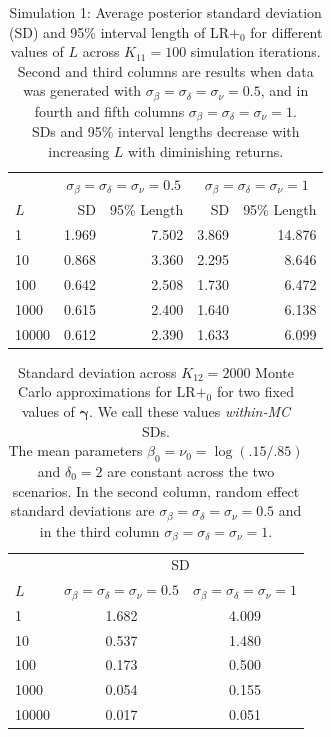 \documentclass[AMA,STIX1COL]{WileyNJD-v2}
\newcommand{\boldgamma}{\boldsymbol{\gamma}}
\begin{document}
\clearpage

\begin{table}[!ht]
\centering
\begin{tabular}{lrrrr}
         & \multicolumn{2}{c}{$\sigma_{\beta} = \sigma_{\delta} = \sigma_{\nu} = 0.5$}           & \multicolumn{2}{c}{$\sigma_{\beta} = \sigma_{\delta} = \sigma_{\nu} = 1$}                 \\ 
     \cline{2-5}    $L$ & \multicolumn{1}{r}{SD} & \multicolumn{1}{r}{95\% Length} & \multicolumn{1}{r}{SD} & \multicolumn{1}{r}{95\% Length} \\ \hline
1 & 1.969 & 7.502 & 3.869 & 14.876 \\ 
  10 & 0.868 & 3.360 & 2.295 & 8.646 \\ 
  100 & 0.642 & 2.508 & 1.730 & 6.472 \\ 
  1000 & 0.615 & 2.400 & 1.640 & 6.138 \\ 
  10000 & 0.612 & 2.390 & 1.633 & 6.099 \\ 
\end{tabular}
\caption{Simulation 1: Average posterior standard deviation (SD) and 95\% interval length of $\text{LR}+_{0}$ for different values of $L$ across $K_{11} = 100$ simulation iterations.  \\ 
Second and third columns are results when data was generated with $\sigma_{\beta} = \sigma_{\delta} = \sigma_{\nu} = 0.5$, and in fourth and fifth columns $\sigma_{\beta} = \sigma_{\delta} = \sigma_{\nu} = 1$. \\
SDs and 95\% interval lengths decrease with increasing $L$ with diminishing returns.}
\label{table:L}
\end{table}

\clearpage

\begin{table}[ht]
\centering
\begin{tabular}{lcc}
 & \multicolumn{2}{c}{SD}  \\
  \cline{2-3}
$L$ & $\sigma_{\beta} = \sigma_{\delta} = \sigma_{\nu} = 0.5$ & $\sigma_{\beta} = \sigma_{\delta} = \sigma_{\nu} = 1$ \\ 
  \hline
1 & 1.682 & 4.009 \\ 
  10 & 0.537 & 1.480 \\ 
  100 & 0.173 & 0.500 \\ 
  1000 & 0.054 & 0.155 \\ 
  10000 & 0.017 & 0.051 \\ 
   \hline
\end{tabular}
\caption{Standard deviation across $K_{12} = 2000$ Monte Carlo approximations for LR$+_0$ for two fixed values of $\boldgamma$. We call these values \textit{within-MC} SDs.\\
The mean parameters $\beta_0 = \nu_0 = \log(.15 / .85)$ and $\delta_0 = 2$ are constant across the two scenarios. In the second column, random effect standard deviations are
$\sigma_{\beta} = \sigma_{\delta} = \sigma_{\nu} = 0.5$ and in the third column $\sigma_{\beta} = \sigma_{\delta} = \sigma_{\nu} = 1$.}
\label{table:L-one-gamma}
\end{table}
\end{document}
